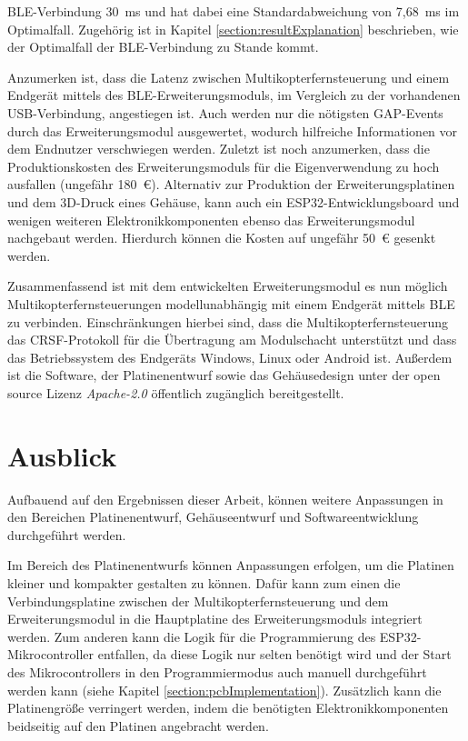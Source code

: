 \ac{BLE}-Verbindung 30~ms und hat dabei eine Standardabweichung von 7,68~ms im Optimalfall. Zugehörig ist in Kapitel \ref{section:resultExplanation} beschrieben, wie der Optimalfall der \ac{BLE}-Verbindung zu Stande kommt.

Anzumerken ist, dass die Latenz zwischen Multikopterfernsteuerung und einem Endgerät mittels des \ac{BLE}-Erweiterungsmoduls, im Vergleich zu der vorhandenen USB-Verbindung, angestiegen ist. Auch werden nur die nötigsten \ac{GAP}-Events durch das Erweiterungsmodul ausgewertet, wodurch hilfreiche Informationen vor dem Endnutzer verschwiegen werden. Zuletzt ist noch anzumerken, dass die Produktionskosten des Erweiterungsmoduls für die Eigenverwendung zu hoch ausfallen (ungefähr 180~€). Alternativ zur Produktion der Erweiterungsplatinen und dem 3D-Druck eines Gehäuse, kann auch ein ESP32-Entwicklungsboard und wenigen weiteren Elektronikkomponenten ebenso das Erweiterungsmodul nachgebaut werden. Hierdurch können die Kosten auf ungefähr 50~€ gesenkt werden. 

Zusammenfassend ist mit dem entwickelten Erweiterungsmodul es nun möglich Multikopterfernsteuerungen modellunabhängig mit einem Endgerät mittels \ac{BLE} zu verbinden. Einschränkungen hierbei sind, dass die Multikopterfernsteuerung das CRSF-Protokoll für die Übertragung am Modulschacht unterstützt und dass das Betriebssystem des Endgeräts Windows, Linux oder Android ist. Außerdem ist die Software, der Platinenentwurf sowie das Gehäusedesign unter der open source Lizenz \textit{Apache-2.0} öffentlich zugänglich bereitgestellt.

\section{Ausblick}
Aufbauend auf den Ergebnissen dieser Arbeit, können weitere Anpassungen in den Bereichen Platinenentwurf, Gehäuseentwurf und Softwareentwicklung durchgeführt werden.

Im Bereich des Platinenentwurfs können Anpassungen erfolgen, um die Platinen kleiner und kompakter gestalten zu können. Dafür kann zum einen die Verbindungsplatine zwischen der Multikopterfernsteuerung und dem Erweiterungsmodul in die Hauptplatine des Erweiterungsmoduls integriert werden. Zum anderen kann die Logik für die Programmierung des ESP32-Mikrocontroller entfallen, da diese Logik nur selten benötigt wird und der Start des Mikrocontrollers in den Programmiermodus auch manuell durchgeführt werden kann (siehe Kapitel \ref{section:pcbImplementation}). Zusätzlich kann die Platinengröße verringert werden, indem die benötigten Elektronikkomponenten beidseitig auf den Platinen angebracht werden.

